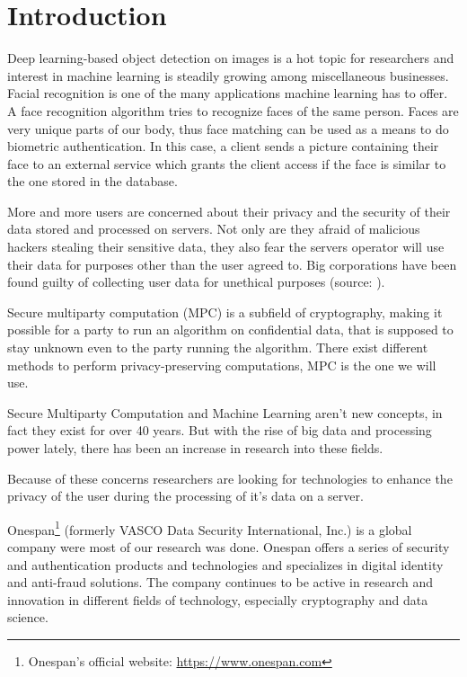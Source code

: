 
\chapter{Introduction}
Deep learning-based object detection on images is a hot topic for researchers and interest in machine learning is steadily growing among miscellaneous businesses. Facial recognition is one of the many applications machine learning has to offer. A face recognition algorithm tries to recognize faces of the same person. Faces are very unique parts of our body, thus face matching can be used as a means to do biometric authentication. In this case, a client sends a picture containing their face to an external service which grants the client access if the face is similar to the one stored in the database.

More and more users are concerned about their privacy and the security of their data stored and processed on servers. Not only are they afraid of malicious hackers stealing their sensitive data, they also fear the servers operator will use their data for purposes other than the user agreed to. Big corporations have been found guilty of collecting user data for unethical purposes (source: \cite{cadwalladr2018revealed}).

Secure multiparty computation (MPC) is a subfield of cryptography, making it possible for a party to run an algorithm on confidential data, that is supposed to stay unknown even to the party running the algorithm. There exist different methods to perform privacy-preserving computations, MPC is the one we will use.

Secure Multiparty Computation and Machine Learning aren't new concepts, in fact they exist for over 40 years. But with the rise of big data and processing power lately, there has been an increase in research into these fields.

Because of these concerns researchers are looking for technologies to enhance the privacy of the user during the processing of it's data on a server.

Onespan\footnote{Onespan's official website: \url{https://www.onespan.com}} (formerly VASCO Data Security International, Inc.) is a global company were most of our research was done. Onespan offers a series of security and authentication products and technologies and specializes in digital identity and anti-fraud solutions. The company continues to be active in research and innovation in different fields of technology, especially cryptography and data science.

